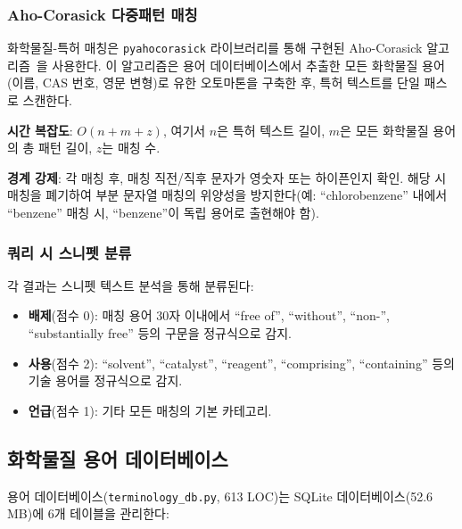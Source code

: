 \documentclass[preprint,12pt]{elsarticle}
\begin{document}
\subsubsection{Aho-Corasick 다중패턴 매칭}

화학물질-특허 매칭은 \texttt{pyahocorasick} 라이브러리를 통해 구현된 Aho-Corasick 알고리즘~\cite{ahocorasick}을 사용한다. 이 알고리즘은 용어 데이터베이스에서 추출한 모든 화학물질 용어(이름, CAS 번호, 영문 변형)로 유한 오토마톤을 구축한 후, 특허 텍스트를 단일 패스로 스캔한다.

\textbf{시간 복잡도}: $O(n + m + z)$, 여기서 $n$은 특허 텍스트 길이, $m$은 모든 화학물질 용어의 총 패턴 길이, $z$는 매칭 수.

\textbf{경계 강제}: 각 매칭 후, 매칭 직전/직후 문자가 영숫자 또는 하이픈인지 확인. 해당 시 매칭을 폐기하여 부분 문자열 매칭의 위양성을 방지한다(예: ``chlorobenzene'' 내에서 ``benzene'' 매칭 시, ``benzene''이 독립 용어로 출현해야 함).

\subsubsection{쿼리 시 스니펫 분류}

각 결과는 스니펫 텍스트 분석을 통해 분류된다:
\begin{itemize}
  \item \textbf{배제}(점수 0): 매칭 용어 30자 이내에서 ``free of'', ``without'', ``non-'', ``substantially free'' 등의 구문을 정규식으로 감지.
  \item \textbf{사용}(점수 2): ``solvent'', ``catalyst'', ``reagent'', ``comprising'', ``containing'' 등의 기술 용어를 정규식으로 감지.
  \item \textbf{언급}(점수 1): 기타 모든 매칭의 기본 카테고리.
\end{itemize}

\subsection{화학물질 용어 데이터베이스}
\label{sec:terminology}

용어 데이터베이스(\texttt{terminology\_db.py}, 613 LOC)는 SQLite 데이터베이스(52.6 MB)에 6개 테이블을 관리한다:
\end{document}
